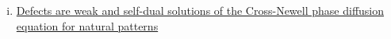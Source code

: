 \documentclass[12pt]{article}
\newcounter{solution}
\begin{document}
\begin{enumerate}[(i)]
    \item \href{https://pdf.sciencedirectassets.com/271587/1-s2.0-S0167278900X00413/1-s2.0-0167278996000735/main.pdf?X-Amz-Security-Token=IQoJb3JpZ2luX2VjEMv%2F%2F%2F%2F%2F%2F%2F%2F%2F%2FwEaCXVzLWVhc3QtMSJHMEUCICmbWyR64A1wCI3Hwg0ZAgI5HIKnTPMRuOHwDh8dvgCFAiEAo%2Fvnx31Z1bd2dlu%2B%2FTBKoMzF7OknS8%2BgUliZTPlrYEwq0gQIVBAFGgwwNTkwMDM1NDY4NjUiDPr4xcbS9wqegfVPTiqvBO1WuMO530B3ssrnBJBF2jZDPbMMGvRGoFzsHIM8EpkK08FfaRD5RNFVZxYkJYQVYTxa4ns4mxO3oA5T1V3Q8iMQd5BelLkb5xlTX17Eob3KM7y9KK1zGhl9KY9rVR610tnFbxJNFYRWcb2hfHIkUhm%2Bmjlg8cybbS3BNU%2Fry6O9Q2XZIAZgccbYdizTpcjVMRcnMvPEcLYqR7LexxPXdtpqfSZ5GXHvAeUfj1tU%2FvSpqtdKlm2eQj3bdww%2B0%2B4Xiava75hcOqspQwvuoObW1Z3dS0C0nsyA%2FYHwwcv16QVKkX4DK1T6r3%2BHBZfQ5ypS3Us8VOfCdp7jexHz7%2FVsNOgGsjVPPyPRrDIfmN68UyXfr5vvTewd2%2BHStXu%2B1PQzF7pZ1DgfgNZ69V%2FCasRg44o6nK3B%2F04EBWfMz6wGieRBvpaUn8vUmPvbNgqntQ54LTYD49FlNJ9k286nQWFR6CxSO7Pk3fPjdgRA9wvC8%2BvlQFxxoKN75XqQ6IYh6awfJ%2F1IF3GwF2Gdr7VZS5Sy1vNeeHZOF38lvshcxoJW3T3PVN6ND4RiT5nYBUjCylITe5gTzcppmByoOOn7c7exfmEwitcrUrVHCu16omd9baWv6%2FzacUhVr4A02OzgcwSxNt9M3X3stas%2BIKyahpP%2FLVuxoHmTl50NczRduwjyfeBgrcCu1FU9ro6Fwfh7LdEHLaINFCRBNPfyTeipDNBgbw9R2OFQXIs0X6jZuWaryKAw6ZW7mAY6qQFMWxe1bdc%2FwqwqcL6mCyutB%2BaxuC5WRGi8jw36M%2FjG5VdiunTYwJwkaf7sFeNK4lIp%2BCMzJKKR7vQIAkxJLXhTQMu%2BOstiT07iIvnDIC6TkIg7%2FVRLxD3tLR3cP9uUt4KUles514ga8GtRecA62d8KUwQn2em9XmR7jEyKhx4VU7s9fAPHqI6UpQYUxEoQi3rKjOmBv1g4axZh1gt%2BRxhO9wP1yha84rUX&X-Amz-Algorithm=AWS4-HMAC-SHA256&X-Amz-Date=20220831T041003Z&X-Amz-SignedHeaders=host&X-Amz-Expires=299&X-Amz-Credential=ASIAQ3PHCVTYRORY7RZH%2F20220831%2Fus-east-1%2Fs3%2Faws4_request&X-Amz-Signature=33c46dee6ce60298dd9043b562ade6356f713732db70f3b1fb742bae8342c347&hash=2bd236b77bbc2fe06aaf61faddfc1011fff08b04c4195c0dedf7f60afcae1e04&host=68042c943591013ac2b2430a89b270f6af2c76d8dfd086a07176afe7c76c2c61&pii=0167278996000735&tid=spdf-be71a088-5432-4119-8437-d62940a7ffbf&sid=f4108f064053494679698ac9f79c6b821331gxrqa&type=client&ua=4d54575503015e5b545b&rr=7432ea0978fd1b0f}{Defects are weak and self-dual solutions of the Cross-Newell phase diffusion equation for natural patterns}

\end{enumerate}
\end{document}
